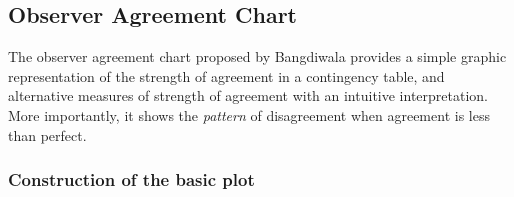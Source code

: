 \documentclass[10pt,krantz2]{krantz}\usepackage[]{graphicx}\usepackage[]{color}
\begin{document}

\subsection[Observer Agreement Chart]{Observer Agreement Chart}
\label{sec:twoway-Bangdiwala}
The observer agreement chart proposed by Bangdiwala
\citeyearpar{Bangdiwala:1985,Bangdiwala:87} provides a simple
graphic representation of the strength of agreement in a contingency
table, and alternative measures of strength of agreement with an intuitive
interpretation. More importantly, it shows the \emph{pattern} of disagreement
when agreement is less than perfect.

\subsubsection{Construction of the basic plot}
\end{document}
